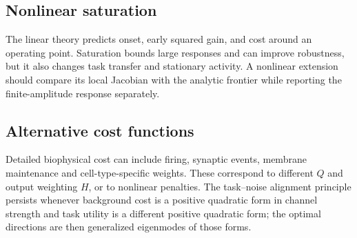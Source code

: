 \documentclass[
  aps,prl,preprint,notitlepage,superscriptaddress,nofootinbib,longbibliography,
  amsmath,amssymb
]{revtex4-2}
\begin{document}
\subsection{Nonlinear saturation}

The linear theory predicts onset, early squared gain, and cost around an operating
point. Saturation bounds large responses and can improve robustness, but it also
changes task transfer and stationary activity. A nonlinear extension should
compare its local Jacobian with the analytic frontier while reporting the
finite-amplitude response separately.

\subsection{Alternative cost functions}

Detailed biophysical cost can include firing, synaptic events, membrane
maintenance and cell-type-specific weights. These correspond to different $Q$
and output weighting $H$, or to nonlinear penalties. The task--noise alignment principle
persists whenever background cost is a positive quadratic form in channel
strength and task utility is a different positive quadratic form; the optimal
directions are then generalized eigenmodes of those forms.



\end{document}
